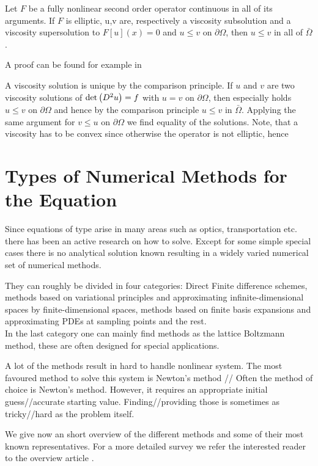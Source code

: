 \begin{theorem}
	Let $F$ be a fully nonlinear second order operator continuous in all of its arguments.
	If $F$ is elliptic,	u,v are, respectively a viscosity subsolution and a viscosity supersolution to $F[u](x)=0$ and $u \leq v$ on $\partial \Omega$, then $u \leq v$ in all of $\bar \Omega$.
\end{theorem}
A proof can be found for example in \cite[Theorem 17.1]{GT1983}

A viscosity solution is unique by the comparison principle. If $u$ and $v$ are two viscosity solutions of $\det{\left(D^2 u\right)}=f$ with $u=v$ on $\partial \Omega$, then especially holds $u \leq v$ on $\partial \Omega$ and hence by the comparison principle $u \leq v$ in  $\bar \Omega$. Applying the same argument for $v \leq u$ on $\partial \Omega$ we find equality of the solutions. Note, that a viscosity has to be convex since otherwise the \MA operator is not elliptic, hence  


\section{Types of Numerical Methods for the \MA Equation}
Since equations of \MA type arise in many areas such as optics, transportation etc. there has been an active research on how to solve. Except for some simple special cases there is no analytical solution known resulting in a widely varied numerical set of numerical methods.

They can roughly be divided in four categories: Direct Finite difference schemes, methods based on variational principles and approximating infinite-dimensional spaces by finite-dimensional spaces, methods based on finite basis expansions and approximating PDEs at sampling points and the rest. \\
In the last category one can mainly find methods as the lattice Boltzmann method, these are often designed for special applications.

A lot of the methods result in hard to handle nonlinear system. The most favoured method to solve this system is Newton's method // Often the method of choice is Newton's method. However, it requires an appropriate initial guess//accurate starting value. Finding//providing those is sometimes as tricky//hard as the problem itself.

We give now an short overview of the different methods and some of their most known representatives. For a more detailed survey we refer the interested reader to the overview article \cite[Section 2.1]{FGN2013}.


